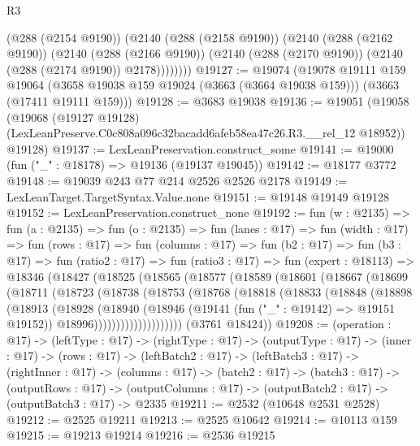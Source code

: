 \begin{lexlean}{R3}
\begin{coremodule}
          (@288 (@2154 @9190))
          (@2140
            (@288 (@2158 @9190))
            (@2140
              (@288 (@2162 @9190))
              (@2140
                (@288 (@2166 @9190))
                (@2140 (@288 (@2170 @9190)) (@2140 (@288 (@2174 @9190)) @2178))))))))
@19127 := @19074
    (@19078
      @19111
      @159
      @19064
      (@3658 @19038 @159 @19024 (@3663 (@3664 @19038 @159)))
      (@3663 (@17411 @19111 @159)))
@19128 := @3683 @19038
@19136 := @19051
    (@19058
      (@19068
        (@19127 @19128)
        (LexLeanPreserve.C0c808a096c32bacadd6afeb58ea47c26.R3.__rel_12 @18952))
      @19128)
@19137 := LexLeanPreservation.construct_some
@19141 := @19000 (fun ("_" : @18178) => @19136 (@19137 @19045))
@19142 := @18177 @3772
@19148 := @19039 @243 @77 @214 @2526 @2526 @2178
@19149 := LexLeanTarget.TargetSyntax.Value.none
@19151 := @19148 @19149 @19128
@19152 := LexLeanPreservation.construct_none
@19192 := fun (w : @2135) =>
  fun (a : @2135) =>
  fun (o : @2135) =>
  fun (lanes : @17) =>
  fun (width : @17) =>
  fun (rows : @17) =>
  fun (columns : @17) =>
  fun (b2 : @17) =>
  fun (b3 : @17) =>
  fun (ratio2 : @17) =>
  fun (ratio3 : @17) =>
  fun (expert : @18113) =>
  @18346
    (@18427
      (@18525
        (@18565
          (@18577
            (@18589
              (@18601
                (@18667
                  (@18699
                    (@18711
                      (@18723
                        (@18738
                          (@18753
                            (@18768
                              (@18818
                                (@18833
                                  (@18848
                                    (@18898
                                      (@18913
                                        (@18928
                                          (@18940
                                            (@18946
                                              (@19141 (fun ("_" : @19142) => @19151 @19152))
                                              @18996))))))))))))))))))))
      (@3761 @18424))
@19208 := (operation : @17) ->
  (leftType : @17) ->
  (rightType : @17) ->
  (outputType : @17) ->
  (inner : @17) ->
  (rows : @17) ->
  (leftBatch2 : @17) ->
  (leftBatch3 : @17) ->
  (rightInner : @17) ->
  (columns : @17) ->
  (batch2 : @17) ->
  (batch3 : @17) ->
  (outputRows : @17) ->
  (outputColumns : @17) -> (outputBatch2 : @17) -> (outputBatch3 : @17) -> @2335
@19211 := @2532 (@10648 @2531 @2528)
@19212 := @2525 @19211
@19213 := @2525 @10642
@19214 := @10113 @159
@19215 := @19213 @19214
@19216 := @2536 @19215

\end{coremodule}
\end{lexlean}
